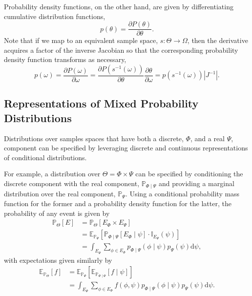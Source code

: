 \documentclass[11pt, oneside]{article}
\newcommand{\dd}{ \mathrm{d} }
\newcommand{\PP}{ \mathbb{P} }
\newcommand{\EE}{ \mathbb{E} }
\begin{document}
Probability density functions, on the other hand, are given by 
differentiating cumulative distribution functions,
%
\begin{equation*}
p \! \left( \theta \right) = 
\frac{\partial P \! \left( \theta \right) }{ \partial \theta}.
\end{equation*}
%
Note that if we map to an equivalent sample space, 
$s : \Theta \rightarrow \Omega$, then the derivative
acquires a factor of the inverse Jacobian so that the
corresponding probability density function transforms
as necessary,
%
\begin{equation*}
p \! \left( \omega \right) 
= 
\frac{\partial P \! \left( \omega \right) }{ \partial \omega}
=
\frac{\partial P \! \left( s^{-1} \! \left( \omega \right) \right) }
{ \partial \theta}
\frac{ \partial \theta }{ \partial \omega }
= 
p \! \left( s^{-1} \! \left( \omega \right) \right) \left| J^{-1} \right|.
\end{equation*}

\subsection{Representations of Mixed Probability Distributions}

Distributions over samples spaces that have both a discrete, $\Phi$,
and a real $\Psi$, component can be specified by leveraging 
discrete and continuous representations of conditional distributions.  

For example, a distribution over $\Theta = \Phi \times \Psi$ can be
specified by conditioning the discrete component with the real
component, $\PP_{\Phi \mid \Psi}$ and providing a marginal distribution
over the real component, $\PP_{\Psi}$.  Using a conditional
probability mass function for the former and a probability density function
for the latter, the probability of any event is given by
%
\begin{align*}
\PP_{\Theta} \! \left[ E \right]
&=
\PP_{\Theta} \! \left[ E_{\Phi} \times E_{\Psi} \right]
\\
&=
\EE_{\PP_{\Psi}} \! \left[
\PP_{\Phi \mid \Psi} \! \left[  E_{\Phi} \mid \psi \right]
\cdot
\mathbb{I}_{E_{\Psi}} \! \left( \psi \right)
\right] 
\\
&= 
\int_{E_{\Psi} }
\sum_{\phi \in E_{\Phi} } p_{\Phi \mid \Psi} \! \left( \phi \mid \psi \right)
p_{\Psi} \! \left( \psi \right) \dd \psi,
\end{align*}
%
with expectations given similarly by
%
\begin{align*}
\EE_{\PP_{\Theta}} \! \left[ f \right]
&=
\EE_{\PP_{\Psi}} \! \left[
\EE_{\PP_{\Phi \mid \Psi}} \! \left[  f \mid \psi \right]
\right] 
\\
&= 
\int_{E_{\Psi} } \sum_{\phi \in E_{\Phi} } f \! \left( \phi, \psi \right) 
p_{\Phi \mid \Psi} \! \left( \phi \mid \psi \right)
p_{\Psi} \! \left( \psi \right) \dd \psi.
\end{align*}
\end{document}
